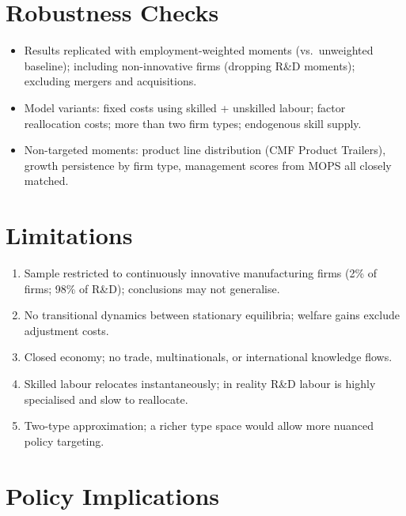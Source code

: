 \section{Robustness Checks}

\begin{itemize}
  \item Results replicated with employment-weighted moments (vs.\ unweighted
    baseline); including non-innovative firms (dropping R\&D moments);
    excluding mergers and acquisitions.
  \item Model variants: fixed costs using skilled + unskilled labour; factor
    reallocation costs; more than two firm types; endogenous skill supply.
  \item Non-targeted moments: product line distribution (CMF Product
    Trailers), growth persistence by firm type, management scores from
    MOPS all closely matched.
\end{itemize}

\section{Limitations}

\begin{enumerate}
  \item Sample restricted to continuously innovative manufacturing firms
    (2\% of firms; 98\% of R\&D); conclusions may not generalise.
  \item No transitional dynamics between stationary equilibria; welfare
    gains exclude adjustment costs.
  \item Closed economy; no trade, multinationals, or international
    knowledge flows.
  \item Skilled labour relocates instantaneously; in reality R\&D labour
    is highly specialised and slow to reallocate.
  \item Two-type approximation; a richer type space would allow more
    nuanced policy targeting.
\end{enumerate}

\section{Policy Implications}

